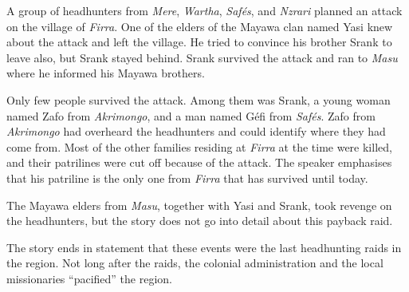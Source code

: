 A group of headhunters from \textit{Mere}, \textit{Wartha}, \textit{Safés}, and \textit{Nzrari} planned an attack on the village of \textit{Firra}. One of the elders of the Mayawa clan named Yasi knew about the attack and left the village. He tried to convince his brother Srank to leave also, but Srank stayed behind. Srank survived the attack and ran to \textit{Masu} where he informed his Mayawa brothers.

Only few people survived the attack. Among them was Srank, a young woman named Zafo from \textit{Akrimongo}, and a man named Géfi from \textit{Safés}. Zafo from \textit{Akrimongo} had overheard the headhunters and could identify where they had come from. Most of the other families residing at \textit{Firra} at the time were killed, and their patrilines were cut off because of the attack. The speaker emphasises that his patriline is the only one from \textit{Firra} that has survived until today.

The Mayawa elders from \textit{Masu}, together with Yasi and Srank, took revenge on the headhunters, but the story does not go into detail about this payback raid.

The story ends in statement that these events were the last headhunting raids in the region. Not long after the raids, the colonial administration and the local missionaries ``pacified'' the region.
